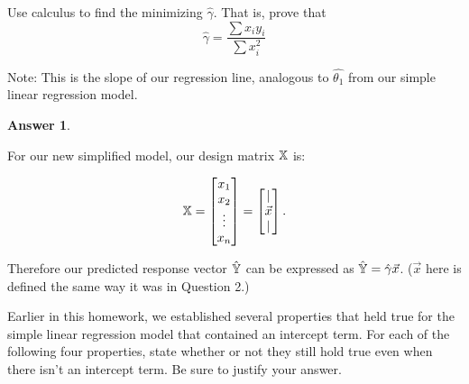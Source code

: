 \documentclass[addpoints, 12pt]{exam}
\theoremstyle{definition}
\newtheorem*{answer}{Answer}
\begin{document}
\begin{questions}
    \setcounter{question}{2} %
\question[4] Use calculus to find the minimizing $\hat{\gamma}$.
That is, prove that 
$$ \hat{\gamma} = \frac{\sum x_iy_i}{\sum x_i^2}$$

Note: This is the slope of our regression line, analogous to $\hat{\theta_1}$ from our simple linear regression model.
    \begin{shaded}
    \begin{answer}


    \end{answer}
    \end{shaded}


\newpage
\question[8] 

For our new simplified model, our design matrix $\Bbb{X}$ is:

$$\Bbb{X} = \begin{bmatrix} x_1 \\ x_2 \\ \vdots \\ x_n \end{bmatrix} = \begin{bmatrix} | \\ \vec{x} \\ | \end{bmatrix}.$$

Therefore our predicted response vector $\hat{\Bbb{Y}}$ can be expressed as $\hat{\Bbb{Y}} = \hat{\gamma} \vec{x}$. ($\vec{x}$ here is defined the same way it was in Question 2.) 

Earlier in this homework, we established several properties that held true for the simple linear regression model that contained an intercept term. For each of the following four properties, state whether or not they still hold true even when there isn't an intercept term. Be sure to justify your answer.

\end{questions}
\end{document}
